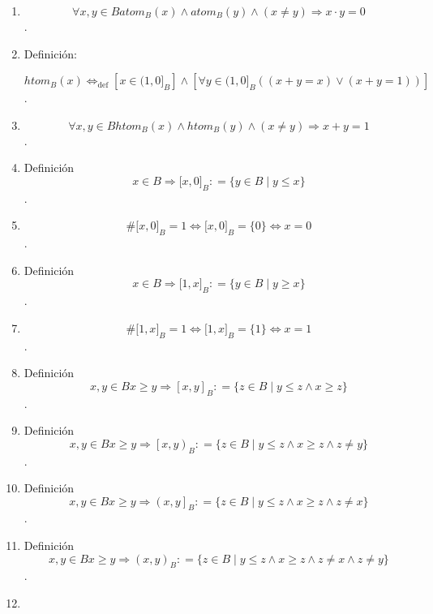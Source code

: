 \begin{enumerate}
\begin{enumerate}
\begin{enumerate}
      \[\mathsf{\mathit{atom}}_{B}{(x)}\Leftrightarrow_{\text{def}}{\left\lbrack {x \in \lbrack 1,0)_{B}} \right\rbrack \land \left\lbrack {\forall{y \in \lbrack 1,0)_{B}}\left( {\left( {{x \cdot y} = x} \right) \vee \left( {{x \cdot y} = 0} \right)} \right)} \right\rbrack}\].
    \item
      \[\forall x,{y \in B}\mathsf{\mathit{atom}}_{B}{{(x)} \land \mathsf{\mathit{atom}}_{B}}{{(y)} \land {({x \neq y})}}\Rightarrow{{x \cdot y} = 0}\].
    \item
      Definición:

      \[\mathsf{\mathit{htom}}_{B}{(x)}\Leftrightarrow_{\text{def}}{\left\lbrack {x \in (1,0\rbrack_{B}} \right\rbrack \land \left\lbrack {\forall{y \in (1,0\rbrack_{B}}\left( {\left( {{x + y} = x} \right) \vee \left( {{x + y} = 1} \right)} \right)} \right\rbrack}\].
    \item
      \[\forall x,{y \in B}\mathsf{\mathit{htom}}_{B}{{(x)} \land \mathsf{\mathit{htom}}_{B}}{{(y)} \land {({x \neq y})}}\Rightarrow{{x + y} = 1}\].
    \item
      Definición\emph{\[{x \in B}\Rightarrow{\lbrack{x,0}\rbrack}_{B}{: = {\{{{y \in B} \mid {y \leq x}}\}}}\]}.
    \item
      \[\#{{\lbrack{x,0}\rbrack}_{B} = 1}\Leftrightarrow{{\lbrack{x,0}\rbrack}_{B} = {\{ 0\}}}\Leftrightarrow{x = 0}\].
    \item
      Definición\emph{\[{x \in B}\Rightarrow{\lbrack{1,x}\rbrack}_{B}{: = {\{{{y \in B} \mid {y \geq x}}\}}}\]}.
    \item
      \[\#{{\lbrack{1,x}\rbrack}_{B} = 1}\Leftrightarrow{{\lbrack{1,x}\rbrack}_{B} = {\{ 1\}}}\Leftrightarrow{x = 1}\].
    \item
      Definición\emph{\[x,{y \in B}{x \geq y}\Rightarrow\left\lbrack {x,y} \right\rbrack_{B}{: = {\{{{z \in B} \mid {{y \leq {z \land x}} \geq z}}\}}}\]}.
    \item
      Definición\emph{\[x,{y \in B}{x \geq y}\Rightarrow\left\lbrack {x,y} \right)_{B}{: = {\{{{z \in B} \mid {{{y \leq {z \land x}} \geq {z \land z}} \neq y}}\}}}\]}.
    \item
      Definición\emph{\[x,{y \in B}{x \geq y}\Rightarrow\left( {x,y} \right\rbrack_{B}{: = {\{{{z \in B} \mid {{{y \leq {z \land x}} \geq {z \land z}} \neq x}}\}}}\]}.
    \item
      Definición\emph{\[x,{y \in B}{x \geq y}\Rightarrow\left( {x,y} \right)_{B}{: = {\{{{z \in B} \mid {{{{y \leq {z \land x}} \geq {z \land z}} \neq {x \land z}} \neq y}}\}}}\]}.
    \item

\end{enumerate}
\end{enumerate}
\end{enumerate}
